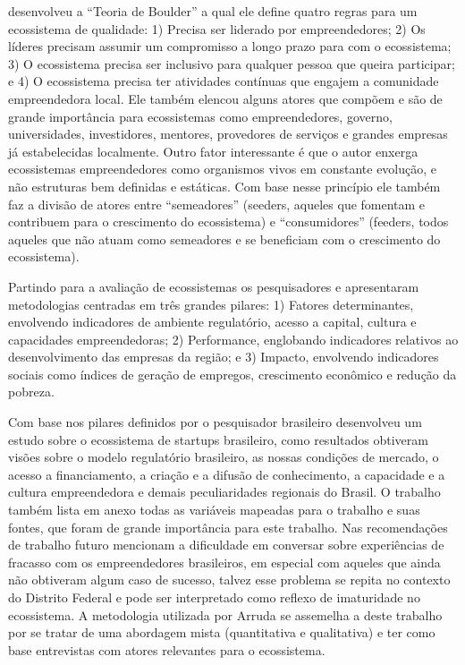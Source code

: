  desenvolveu a ``Teoria de Boulder'' a qual ele define quatro regras para um ecossistema de qualidade: 1) Precisa ser liderado por empreendedores; 2) Os líderes precisam assumir um compromisso a longo prazo para com o ecossistema; 3) O ecossistema precisa ser inclusivo para qualquer pessoa que queira participar; e 4) O ecossistema precisa ter atividades contínuas que engajem a comunidade empreendedora local. Ele também elencou alguns atores que compõem e são de grande importância para ecossistemas como empreendedores, governo, universidades, investidores, mentores, provedores de serviços e grandes empresas já estabelecidas localmente. Outro fator interessante é que o autor enxerga ecossistemas empreendedores como organismos vivos em constante evolução, e não estruturas bem definidas e estáticas. Com base nesse princípio ele também faz a divisão de atores entre ``semeadores'' (seeders, aqueles que fomentam e contribuem para o crescimento do ecossistema) e ``consumidores'' (feeders, todos aqueles que não atuam como semeadores e se beneficiam com o crescimento do ecossistema).  

Partindo para a avaliação de ecossistemas os pesquisadores  e  apresentaram metodologias centradas em três grandes pilares: 1) Fatores determinantes, envolvendo indicadores de ambiente regulatório, acesso a capital, cultura e capacidades empreendedoras; 2) Performance, englobando indicadores relativos ao desenvolvimento das empresas da região; e 3) Impacto, envolvendo indicadores sociais como índices de geração de empregos, crescimento econômico e redução da pobreza.

Com base nos pilares definidos por  o pesquisador brasileiro  desenvolveu um estudo sobre o ecossistema de startups brasileiro, como resultados obtiveram visões sobre o modelo regulatório brasileiro, as nossas condições de mercado, o acesso a financiamento, a criação e a difusão de conhecimento, a capacidade e a cultura empreendedora e demais peculiaridades regionais do Brasil. O trabalho também lista em anexo todas as variáveis mapeadas para o trabalho e suas fontes, que foram de grande importância para este trabalho. Nas recomendações de trabalho futuro mencionam a dificuldade em conversar sobre experiências de fracasso com os empreendedores brasileiros, em especial com aqueles que ainda não obtiveram algum caso de sucesso, talvez esse problema se repita no contexto do Distrito Federal e pode ser interpretado como reflexo de imaturidade no ecossistema. A metodologia utilizada por Arruda se assemelha a deste trabalho por se tratar de uma abordagem mista (quantitativa e qualitativa) e ter como base entrevistas com atores relevantes para o ecossistema.

